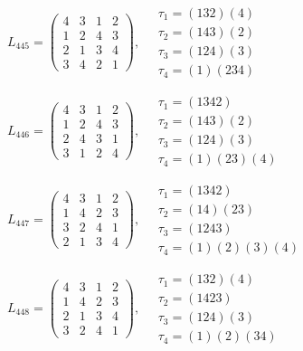 $L_{445} = \begin{pmatrix} 4 & 3 & 1 & 2 \\ 1 & 2 & 4 & 3 \\ 2 & 1 & 3 & 4 \\ 3 & 4 & 2 & 1 \end{pmatrix}, \quad \begin{matrix} \tau_{1} = (1 3 2)(4) \\ \tau_{2} = (1 4 3)(2) \\ \tau_{3} = (1 2 4)(3) \\ \tau_{4} = (1)(2 3 4) \end{matrix}$

$L_{446} = \begin{pmatrix} 4 & 3 & 1 & 2 \\ 1 & 2 & 4 & 3 \\ 2 & 4 & 3 & 1 \\ 3 & 1 & 2 & 4 \end{pmatrix}, \quad \begin{matrix} \tau_{1} = (1 3 4 2) \\ \tau_{2} = (1 4 3)(2) \\ \tau_{3} = (1 2 4)(3) \\ \tau_{4} = (1)(2 3)(4) \end{matrix}$

$L_{447} = \begin{pmatrix} 4 & 3 & 1 & 2 \\ 1 & 4 & 2 & 3 \\ 3 & 2 & 4 & 1 \\ 2 & 1 & 3 & 4 \end{pmatrix}, \quad \begin{matrix} \tau_{1} = (1 3 4 2) \\ \tau_{2} = (1 4)(2 3) \\ \tau_{3} = (1 2 4 3) \\ \tau_{4} = (1)(2)(3)(4) \end{matrix}$

$L_{448} = \begin{pmatrix} 4 & 3 & 1 & 2 \\ 1 & 4 & 2 & 3 \\ 2 & 1 & 3 & 4 \\ 3 & 2 & 4 & 1 \end{pmatrix}, \quad \begin{matrix} \tau_{1} = (1 3 2)(4) \\ \tau_{2} = (1 4 2 3) \\ \tau_{3} = (1 2 4)(3) \\ \tau_{4} = (1)(2)(3 4) \end{matrix}$

